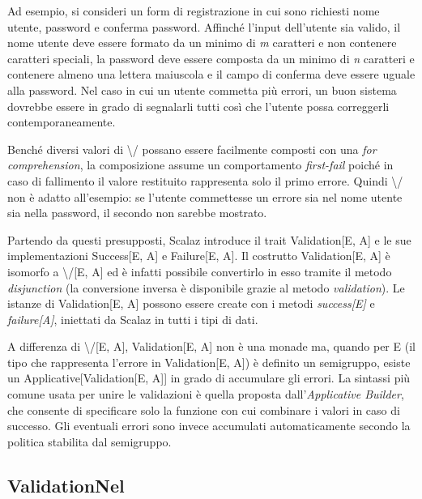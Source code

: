 Ad esempio, si consideri un form di registrazione in cui sono richiesti nome utente, password e conferma password. Affinché l'input dell'utente sia valido, il nome utente deve essere formato da un minimo di \textit{m} caratteri e non contenere caratteri speciali, la password deve essere composta da un minimo di \textit{n} caratteri e contenere almeno una lettera maiuscola e il campo di conferma deve essere uguale alla password. Nel caso in cui un utente commetta più errori, un buon sistema dovrebbe essere in grado di segnalarli tutti così che l'utente possa correggerli contemporaneamente.

Benché diversi valori di \textbackslash/ possano essere facilmente composti con una \textit{for comprehension}, la composizione assume un comportamento \textit{first-fail} poiché in caso di fallimento il valore restituito rappresenta solo il primo errore. Quindi \textbackslash/ non è adatto all'esempio: se l'utente commettesse un errore sia nel nome utente sia nella password, il secondo non sarebbe mostrato.

Partendo da questi presupposti, Scalaz introduce il trait Validation[E, A] e le sue implementazioni Success[E, A] e Failure[E, A]. Il costrutto Validation[E, A] è isomorfo a \textbackslash/[E, A] ed è infatti possibile convertirlo in esso tramite il metodo \textit{disjunction} (la conversione inversa è disponibile grazie al metodo \textit{validation}). Le istanze di Validation[E, A] possono essere create con i metodi \textit{success[E]} e \textit{failure[A]}, iniettati da Scalaz in tutti i tipi di dati.

A differenza di \textbackslash/[E, A], Validation[E, A] non è una monade ma, quando per E (il tipo che rappresenta l'errore in Validation[E, A]) è definito un semigruppo, esiste un Applicative[Validation[E, A]] in grado di accumulare gli errori. La sintassi più comune usata per unire le validazioni è quella proposta dall'\textit{Applicative Builder}, che consente di specificare solo la funzione con cui combinare i valori in caso di successo. Gli eventuali errori sono invece accumulati automaticamente secondo la politica stabilita dal semigruppo.



\subsection{ValidationNel}

